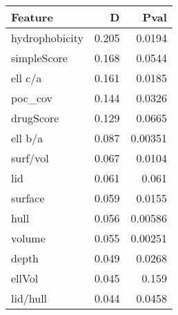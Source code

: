 \begin{tabular}{lrr}
\hline
 Feature        &     D &    Pval \\
\hline
 hydrophobicity & 0.205 & 0.0194  \\
 simpleScore    & 0.168 & 0.0544  \\
 ell c/a        & 0.161 & 0.0185  \\
 poc\_cov        & 0.144 & 0.0326  \\
 drugScore      & 0.129 & 0.0665  \\
 ell b/a        & 0.087 & 0.00351 \\
 surf/vol       & 0.067 & 0.0104  \\
 lid            & 0.061 & 0.061   \\
 surface        & 0.059 & 0.0155  \\
 hull           & 0.056 & 0.00586 \\
 volume         & 0.055 & 0.00251 \\
 depth          & 0.049 & 0.0268  \\
 ellVol         & 0.045 & 0.159   \\
 lid/hull       & 0.044 & 0.0458  \\
\hline
\end{tabular}